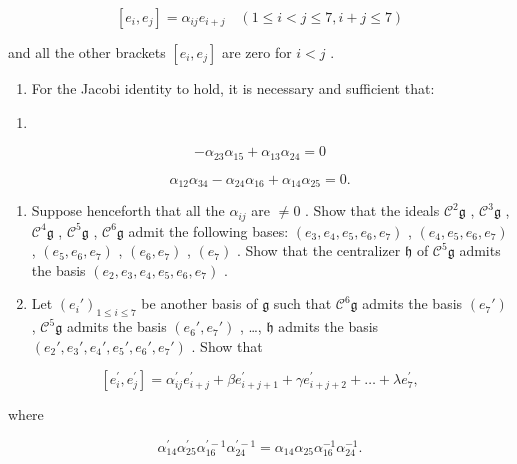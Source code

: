 \[
\left[ e _ {i}, e _ {j} \right] = \alpha_ {i j} e _ {i + j} \quad (1 \leqslant i <   j \leqslant 7, i + j \leqslant 7)\tag{1}
\]

and all the other brackets \([e_i, e_j]\) are zero for \(i < j\) .

\begin{enumerate}
\def\labelenumi{(\alph{enumi})}
\tightlist
\item
  For the Jacobi identity to hold, it is necessary and sufficient that:
\end{enumerate}

\begin{enumerate}
\def\labelenumi{(\arabic{enumi})}
\setcounter{enumi}{1}
\tightlist
\item
\end{enumerate}

\[
- \alpha_ {2 3} \alpha_ {1 5} + \alpha_ {1 3} \alpha_ {2 4} = 0\tag{2}
\]

\[
\alpha_ {1 2} \alpha_ {3 4} - \alpha_ {2 4} \alpha_ {1 6} + \alpha_ {1 4} \alpha_ {2 5} = 0.\tag{3}
\]

\begin{enumerate}
\def\labelenumi{(\alph{enumi})}
\setcounter{enumi}{1}
\item
  Suppose henceforth that all the \(\alpha_{ij}\) are \(\neq 0\) . Show that the ideals \(\mathcal{C}^2\mathfrak{g}\) , \(\mathcal{C}^3\mathfrak{g}\) , \(\mathcal{C}^4\mathfrak{g}\) , \(\mathcal{C}^5\mathfrak{g}\) , \(\mathcal{C}^6\mathfrak{g}\) admit the following bases: \((e_3, e_4, e_5, e_6, e_7)\) , \((e_4, e_5, e_6, e_7)\) , \((e_5, e_6, e_7)\) , \((e_6, e_7)\) , \((e_7)\) . Show that the centralizer \(\mathfrak{h}\) of \(\mathcal{C}^5\mathfrak{g}\) admits the basis \((e_2, e_3, e_4, e_5, e_6, e_7)\) .
\item
  Let \((e_i')_{1 \leqslant i \leqslant 7}\) be another basis of \(\mathfrak{g}\) such that \(\mathcal{C}^6\mathfrak{g}\) admits the basis \((e_7')\) , \(\mathcal{C}^5\mathfrak{g}\) admits the basis \((e_6', e_7')\) , \ldots, \(\mathfrak{h}\) admits the basis \((e_2', e_3', e_4', e_5', e_6', e_7')\) . Show that
\end{enumerate}

\[
\left[ e _ {i} ^ {\prime}, e _ {j} ^ {\prime} \right] = \alpha_ {i j} ^ {\prime} e _ {i + j} ^ {\prime} + \beta e _ {i + j + 1} ^ {\prime} + \gamma e _ {i + j + 2} ^ {\prime} + \dots + \lambda e _ {7} ^ {\prime},
\]

where

\[
\alpha_ {1 4} ^ {\prime} \alpha_ {2 5} ^ {\prime} \alpha_ {1 6} ^ {\prime - 1} \alpha_ {2 4} ^ {\prime - 1} = \alpha_ {1 4} \alpha_ {2 5} \alpha_ {1 6} ^ {- 1} \alpha_ {2 4} ^ {- 1}.
\]

